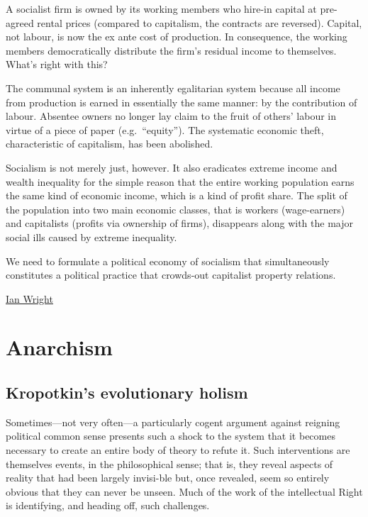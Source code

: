 \documentclass[
]{book}
\begin{document}
A socialist firm is owned by its working members who hire-in capital at pre-agreed rental prices (compared to capitalism, the contracts are reversed). Capital, not labour, is now the ex ante cost of production. In consequence, the working members democratically distribute the firm's residual income to themselves.
What's right with this?

The communal system is an inherently egalitarian system because all income from production is earned in essentially the same manner: by the contribution of labour. Absentee owners no longer lay claim to the fruit of others' labour in virtue of a piece of paper (e.g.~``equity''). The systematic economic theft, characteristic of capitalism, has been abolished.

Socialism is not merely just, however. It also eradicates extreme income and wealth inequality for the simple reason that the entire working population earns the same kind of economic income, which is a kind of profit share. The split of the population into two main economic classes, that is workers (wage-earners) and capitalists (profits via ownership of firms), disappears along with the major social ills caused by extreme inequality.

We need to formulate a political economy of socialism
that simultaneously constitutes a political practice
that crowds-out capitalist property relations.

\href{https://ianwrightsite.wordpress.com/2016/12/14/first-blog-post/}{Ian Wright}

\hypertarget{anarchism}{%
\chapter{Anarchism}\label{anarchism}}

\hypertarget{kropotkins-evolutionary-holism}{%
\section{Kropotkin's evolutionary holism}\label{kropotkins-evolutionary-holism}}

Sometimes---not very often---a particularly cogent argument against reigning political common sense presents such a shock to the system that it becomes necessary to create an entire body of theory to refute it. Such interventions are themselves events, in the philosophical sense; that is, they reveal aspects of reality that had been largely invisi-ble but, once revealed, seem so entirely obvious that they can never be unseen. Much of the work of the intellectual Right is identifying, and heading off, such challenges.
\end{document}
